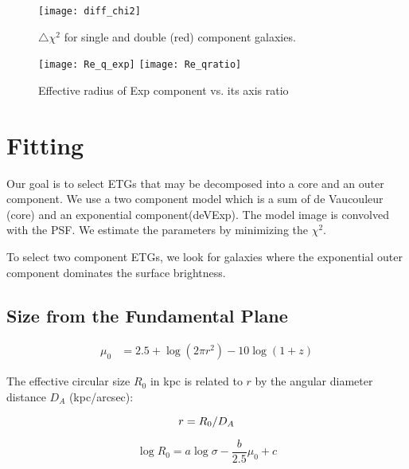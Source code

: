 \documentclass[iop]{emulateapj}
\newcommand{\chisq}{\ensuremath{\chi^2}}
\newcommand\todo[1]{\textcolor{red}{#1}}
\begin{document}
\begin{figure}[]
    \begin{center}
        \texttt{[image: diff\_chi2]}
    \end{center}
    \caption{$\triangle\chisq$ for single and double (red) component galaxies.}
    \label{fig:DiffChisq}
\end{figure}

\begin{figure*}[]
    \begin{center}
        \texttt{[image: Re\_q\_exp]}
        \texttt{[image: Re\_qratio]}
    \end{center}
    \caption{Effective radius of Exp component vs. its axis ratio}
    \label{fig:Req}
\end{figure*}

\section{Fitting}

Our goal is to select ETGs that may be decomposed into a core and an outer
component.
We use a two component model which is a sum of de Vaucouleur (core)
and an exponential component(deVExp).
The model image is convolved with the PSF.
We estimate the parameters by minimizing the \chisq.

To select two component ETGs, we look for galaxies where the exponential
outer component dominates the surface brightness. 

\subsection{Size from the Fundamental Plane}
\todo{}

\begin{eqnarray}
       \mu_0 &= 2.5 + \log(2 \pi r^2) - 10 \log(1+z)
\end{eqnarray}

The effective circular size $R_0$ in kpc is related to $r$ by
the angular diameter distance $D_A$ (kpc/arcsec):

\begin{equation}
    r = R_0 / D_A \\
\end{equation}

\begin{equation}
    \log R_0 = a \log \sigma - \frac{b}{2.5} \mu_0 + c
\end{equation}
\end{document}

